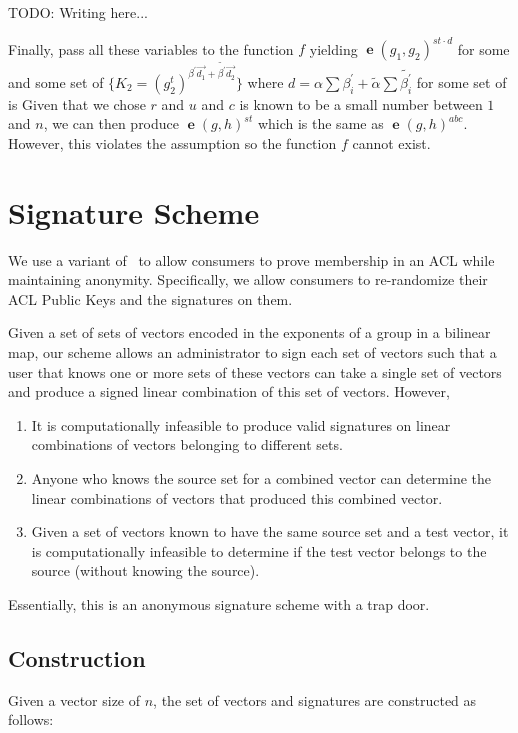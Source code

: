 \documentclass[pdftex,12pt,a4papaer,twoside,notitlepage]{report}
\DeclareMathOperator{\e}{\mathbf{e}}
\begin{document}
TODO: Writing here...

Finally, pass all these variables to the function $f$ yielding $\e(g_1, g_2)^{st
  \cdot d}$ for some 
and some set of $\{K_2 = (g_2^t)^{\beta^\prime\vec{d_1} +
  \tilde{\beta^\prime}\vec{d_2}}\}$ where $d = \alpha\sum{\beta_i^\prime} +
\tilde{\alpha}\sum{\tilde{\beta_i^\prime}}$ for some set of is Given that we
chose $r$ and $u$ and $c$ is known to be a small number between $1$ and $n$, we
can then produce $\e(g, h)^{st}$ which is the same as $\e(g, h)^{abc}$. However,
this violates the assumption so the function $f$ cannot exist.

\section{Signature Scheme}

We use a variant of~\cite{signature} to allow consumers to prove membership in
an ACL while maintaining anonymity. Specifically, we allow consumers to
re-randomize their ACL Public Keys and the signatures on them.

Given a set of sets of vectors encoded in the exponents of a group in a bilinear
map, our scheme allows an administrator to sign each set of vectors such that a
user that knows one or more sets of these vectors can take a single set of
vectors and produce a signed linear combination of this set of vectors. However,

\begin{enumerate}
\item It is computationally infeasible to produce valid signatures on linear
  combinations of vectors belonging to different sets.
\item Anyone who knows the source set for a combined vector can determine the
  linear combinations of vectors that produced this combined vector.
\item Given a set of vectors known to have the same source set and a test vector, it is
  computationally infeasible to determine if the test vector belongs to the
  source (without knowing the source).
\end{enumerate}

Essentially, this is an anonymous signature scheme with a trap door.

\subsection{Construction}

Given a vector size of $n$, the set of vectors and signatures are constructed as
follows:
\end{document}
